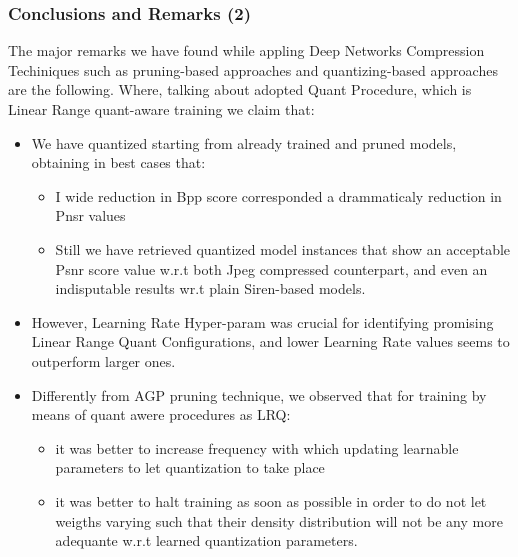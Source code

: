 \begin{frame}
    \frametitle{Conclusions and Remarks (2)}
    The major remarks we have found while appling Deep Networks Compression Techiniques such as pruning-based approaches and quantizing-based approaches
    are the following. Where, talking about adopted Quant Procedure, which is Linear Range quant-aware training we claim that:
    \begin{itemize}
        \item We have quantized starting from already trained and pruned models, obtaining in best cases that:
        \begin{itemize}
            \item I wide reduction in Bpp score corresponded a drammaticaly reduction in Pnsr values
            \item Still we have retrieved quantized model instances that show an acceptable Psnr score value w.r.t both Jpeg compressed counterpart,
            and even an indisputable results wr.t plain Siren-based models.
        \end{itemize}
        \item However, Learning Rate Hyper-param was crucial for identifying promising Linear Range Quant Configurations, and lower Learning Rate values
        seems to outperform larger ones.
        \item Differently from AGP pruning technique, we observed that for training by means of quant awere procedures as LRQ:
        \begin{itemize}
            \item it was better to increase frequency with which updating learnable parameters to let quantization to take place
            \item it was better to halt training as soon as possible in order to do not let weigths varying such that their density distribution will not
            be any more adequante w.r.t learned quantization parameters.
        \end{itemize}        
    \end{itemize}
\end{frame}

